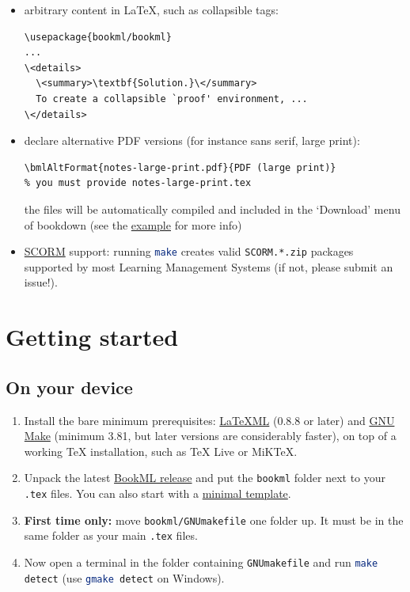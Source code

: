 \documentclass[a4paper,british]{article}
\def\cmdinline{\lstinline[language=bash,frame=none]}
\begin{document}
\begin{itemize}
    \begin{lstlisting}[style=bookml]
\usepackage{bookml/bookml}\bmlImageEnvironment{tikzpicture}
    \end{lstlisting}
  \item arbitrary \HTML{} content in \LaTeX{}, such as collapsible tags:
    \begin{lstlisting}[style=bookml]
\usepackage{bookml/bookml}
...
\<details>
  \<summary>\textbf{Solution.}\</summary>
  To create a collapsible `proof' environment, ...
\</details>
    \end{lstlisting}
  \item declare alternative PDF versions (for instance sans serif, large print):
    \begin{lstlisting}[style=bookml]
\bmlAltFormat{notes-large-print.pdf}{PDF (large print)}
% you must provide notes-large-print.tex
    \end{lstlisting}
    the files will be automatically compiled and included in the `Download' menu of bookdown (see the \href{https://github.com/vlmantova/bookml/releases/latest/download/example.zip}{example} for more info)
  \item \href{https://scorm.com/}{SCORM} support: running \cmdinline{make} creates valid \texttt{SCORM.*.zip} packages supported by most Learning Management Systems (if not, please submit an issue!).
\end{itemize}

\tableofcontents

\section{Getting started}\label{get-started}

\subsection{On your device}\label{get-started-on-your-device}

\begin{enumerate}
  \item Install the bare minimum prerequisites: \href{https://dlmf.nist.gov/LaTeXML/get.html}{LaTeXML} (0.8.8 or later) and \href{https://www.gnu.org/software/make/}{GNU Make} (minimum 3.81, but later versions are considerably faster), on top of a working \TeX{} installation, such as \TeX{} Live or MiK\TeX{}.
  \item Unpack the latest \href{https://github.com/vlmantova/bookml/releases/latest/download/release.zip}{BookML release} and put the \texttt{bookml} folder next to your \texttt{.tex} files. You can also start with a \href{https://github.com/vlmantova/bookml/releases/latest/download/template.zip}{minimal template}.
  \item \textbf{First time only:} move \texttt{bookml/GNUmakefile} one folder up. It must be in the same folder as your main \texttt{.tex} files.
  \item Now open a terminal in the folder containing \texttt{GNUmakefile} and run \cmdinline{make detect} (use \cmdinline{gmake detect} on Windows).
\end{enumerate}
\end{document}
